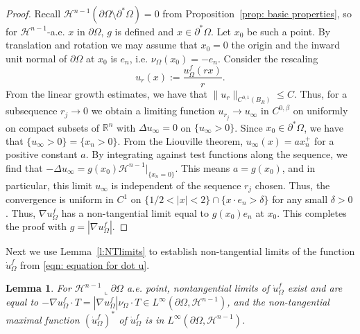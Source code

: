 \documentclass[10pt, reqno]{amsart}
\numberwithin{equation}{section}
\newtheorem{lemma}[theorem]{Lemma}
\def\W{\Omega}
\def\na{\nabla}
\begin{document}
\begin{proof}
Recall $\mathcal{H}^{n-1}(\partial \W \setminus \partial^*\W) =0$ from Proposition~\ref{prop: basic properties}, so for $\mathcal{H}^{n-1}$-a.e. $x$ in $\partial \W$, $g$ is defined and $x \in \partial^*\W$. Let  $x_0$ be such a point.
%
By translation and rotation we may assume that $x_0=0$ the origin and  the inward unit normal of $\partial \W$ at $x_0$ is $e_n$, i.e. $\nu_\W(x_0) =-e_n$. Consider the rescaling 
 \[
 u_r(x):= \frac{u_{\Omega}^f(rx)}{r}. 
 \]
From the linear growth estimates, we have that $\| u_r \|_{C^{0,1}(B_R)} \leq C$. Thus, for a subsequence $r_j \to 0$ we obtain a limiting function $u_{r_j} \to u_{\infty}$ in $C^{0,\beta}$ on uniformly on compact subsets of $\mathbb{R}^n$ with $\Delta u_{\infty}=0$ on $\{u_{\infty}>0\}$. Since $x_0 \in \partial^* \W$, we have that $\{u_{\infty}>0\}=\{x_n>0\}$. From the Liouville theorem, $u_\infty(x) = a x_n^+$ for a positive constant $a$. 
By integrating against test functions along the sequence, we find that $ -\Delta u_\infty= g(x_0) \mathcal{H}^{n-1}|_{\{x_n=0\}}$. This means $a = g(x_0)$, and in particular,  
this limit $u_\infty$ is independent of the sequence $r_j$ chosen. Thus, the convergence is uniform in $C^1$ on $\{1/2<|x|<2\}\cap \{x \cdot e_n > \delta\}$ for any small $\delta >0$. Thus, $\nabla u_{\Omega}^f$ has a non-tangential limit equal to $g(x_0) e_n$ at $x_0$. This completes the proof with $g= |\na u_\W^f|.$
\end{proof}


Next we use Lemma~\ref{l:NTlimits} to establish non-tangential limits of the function $\dot{u}_\W^f$ from \eqref{eqn: equation for dot u}. 
\begin{lemma} \label{l:NTlimits2} For $\mathcal{H}^{n-1}\llcorner{\partial \W}$ a.e. point, nontangential limits of $\dot{u}_{\W}^f$ exist and are equal to  $-\nabla u_\W^f\cdot T =|\nabla u_\W^f|\nu_\W \cdot T \in L^\infty(\partial \W, \mathcal{H}^{n-1})$,   and the non-tangential maximal function $(\dot{u}_{\W}^f)^*$ of $\dot{u}_{\W}^f$ is in $L^\infty(\partial \W, \mathcal{H}^{n-1})$.
\end{lemma}
\end{document}
